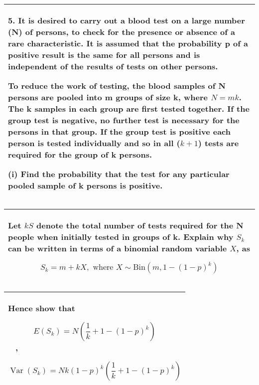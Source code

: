 \documentclass[a4paper,12pt]{article}
\begin{document}
\begin{table}[ht!]
     \centering
     \begin{tabular}{|p{15cm}|}
     \hline        
5. It is desired to carry out a blood test on a large number (N) of persons, to check for the presence or absence of a rare characteristic.  It is assumed that the probability p of a positive result is the same for all persons and is independent of the results of tests on other persons. 
 
To reduce the work of testing, the blood samples of N persons are pooled into m groups of size k, where $N = mk$.  The k samples in each group are first tested together.  If the group test is negative, no further test is necessary for the persons in that group.  If the group test is positive each person is tested individually and so in all ($k + 1$) tests are required for the group of k persons. 
 
(i) Find the probability that the test for any particular pooled sample of k persons is positive. 
 
\\ \hline
      \end{tabular}
    \end{table}
    
  \begin{table}[ht!]
     \centering
     \begin{tabular}{|p{15cm}|}
     \hline   Let $kS$ denote the total number of tests required for the N people when initially tested in groups of k.  Explain why $S_k$ can be written in terms of a binomial random variable $X$, as 
 
\[S_k = m + kX, \mbox{ where } X \sim \mbox{Bin}\left(m, 1-(1-p)^k\right)\]
\\ \hline
      \end{tabular}
    \end{table}
    
  \begin{table}[ht!]
     \centering
     \begin{tabular}{|p{15cm}|}
     \hline   Hence show that 

\[ E(S_k) =  N \left( \frac{1}{k} + 1-(1-p)^k\right)  \] , 
 
\[ \operatorname{Var}(S_k) =  Nk (1-p)^k \left( \frac{1}{k} + 1-(1-p)^k\right)  \]
\\ \hline
      \end{tabular}
    \end{table}
    

\item 
\end{document}

